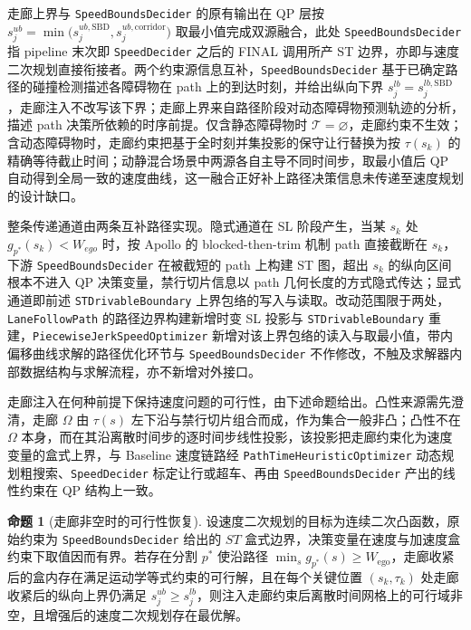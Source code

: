 \documentclass[a4paper,zihao=5]{ctexart}
\theoremstyle{definition}
\newtheorem{proposition}{命题}[section]
\begin{document}
走廊上界与 \texttt{SpeedBoundsDecider} 的原有输出在 QP 层按 $s_j^{ub} = \min\big(s_j^{ub,\mathrm{SBD}}, s_j^{ub,\mathrm{corridor}}\big)$ 取最小值完成双源融合，此处 \texttt{SpeedBoundsDecider} 指 pipeline 末次即 \texttt{SpeedDecider} 之后的 FINAL 调用所产 ST 边界，亦即与速度二次规划直接衔接者。两个约束源信息互补，\texttt{SpeedBoundsDecider} 基于已确定路径的碰撞检测描述各障碍物在 path 上的到达时刻，并给出纵向下界 $s_j^{lb}=s_j^{lb,\mathrm{SBD}}$，走廊注入不改写该下界；走廊上界来自路径阶段对动态障碍物预测轨迹的分析，描述 path 决策所依赖的时序前提。仅含静态障碍物时 $\mathcal{T}=\varnothing$，走廊约束不生效；含动态障碍物时，走廊约束把基于全时刻并集投影的保守让行替换为按 $\tau(s_k)$ 的精确等待截止时间；动静混合场景中两源各自主导不同时间步，取最小值后 QP 自动得到全局一致的速度曲线，这一融合正好补上路径决策信息未传递至速度规划的设计缺口。

整条传递通道由两条互补路径实现。隐式通道在 SL 阶段产生，当某 $s_k$ 处 $g_{p^{*}}(s_k)<W_{ego}$ 时，按 Apollo 的 blocked-then-trim 机制 path 直接截断在 $s_k$，下游 \texttt{SpeedBoundsDecider} 在被截短的 path 上构建 ST 图，超出 $s_k$ 的纵向区间根本不进入 QP 决策变量，禁行切片信息以 path 几何长度的方式隐式传达；显式通道即前述 \texttt{STDrivableBoundary} 上界包络的写入与读取。改动范围限于两处，\texttt{LaneFollowPath} 的路径边界构建新增时变 SL 投影与 \texttt{STDrivableBoundary} 重建，\texttt{PiecewiseJerkSpeedOptimizer} 新增对该上界包络的读入与取最小值，带内偏移曲线求解的路径优化环节与 \texttt{SpeedBoundsDecider} 不作修改，不触及求解器内部数据结构与求解流程，亦不新增对外接口。

走廊注入在何种前提下保持速度问题的可行性，由下述命题给出。凸性来源需先澄清，走廊 $\Omega$ 由 $\tau(s)$ 左下沿与禁行切片组合而成，作为集合一般非凸；凸性不在 $\Omega$ 本身，而在其沿离散时间步的逐时间步线性投影，该投影把走廊约束化为速度变量的盒式上界，与 Baseline 速度链路经 \texttt{PathTimeHeuristicOptimizer} 动态规划粗搜索、\texttt{SpeedDecider} 标定让行或超车、再由 \texttt{SpeedBoundsDecider} 产出的线性约束在 QP 结构上一致。

\begin{proposition}[走廊非空时的可行性恢复]
\label{prop:feasibility_recovery}
设速度二次规划的目标为连续二次凸函数，原始约束为 \texttt{SpeedBoundsDecider} 给出的 $ST$ 盒式边界，决策变量在速度与加速度盒约束下取值因而有界。若存在分割 $p^{*}$ 使沿路径 $\min_s g_{p^{*}}(s) \geq W_{\text{ego}}$，走廊收紧后的盒内存在满足运动学等式约束的可行解，且在每个关键位置 $(s_k, \tau_k)$ 处走廊收紧后的纵向上界仍满足 $s_j^{ub} \geq s_j^{lb}$，则注入走廊约束后离散时间网格上的可行域非空，且增强后的速度二次规划存在最优解。
\end{proposition}
\end{document}
